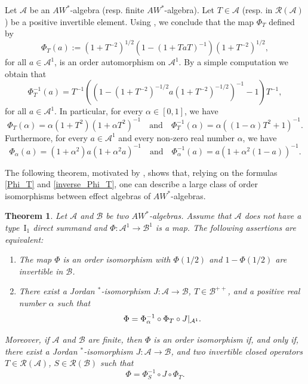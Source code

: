 \documentclass[12pt]{amsart}
\newtheorem{thm}{Theorem}[section]
\theoremstyle{definition}
\theoremstyle{remark}
\numberwithin{equation}{section}
\begin{document}
Let $\mathcal{A}$ be an $AW^*$-algebra (resp. finite  $AW^*$-algebra). Let $T\in\mathcal{A}$ (resp. in $\mathcal{R(A)}$)  be a positive invertible element. Using \cite[Lemma 8.12]{Berberian2}, we conclude that the map $\Phi_T$ defined  by	
\begin{equation}\label{Phi_T}
\Phi_T(a):=(1+T^{-2})^{1/2}\left(  1-(1+TaT)^{-1}\right) (1+T^{-2})^{1/2},	
\end{equation}
for all $a\in\mathcal{A}^1$, is an order automorphism on $\mathcal{A}^1$. By a simple computation we obtain  that 
\begin{equation}\label{inverse_Phi_T}
\Phi_T^{-1}(a)=T^{-1}\left(\left(   1-(1+T^{-2})^{-1/2}a(1+T^{-2})^{-1/2}\right)^{-1} -1\right) T^{-1},	
\end{equation}
for all $a\in\mathcal{A}^1$. In particular, for every   $\alpha\in[0,1]$, we have
\begin{equation}\label{Phi(alpha)}
\Phi_T(\alpha)=\alpha (1+T^{2})(1+\alpha T^2)^{-1} \quad \mbox{and} \quad \Phi_T^{-1}(\alpha)=\alpha \left( (1-\alpha)T^2+1\right)^{-1}. 	
\end{equation}
Furthermore, for every $a\in\mathcal{A}^1$ and every  non-zero real number $\alpha$, we have 
\begin{equation}\label{Phi_alpha}
	\Phi_\alpha(a)=(1+\alpha^{2})a(1+\alpha^2a)^{-1} \quad \mbox{and} \quad \Phi_\alpha^{-1}(a)=a \left(1+\alpha^2(1-a)\right)^{-1}.	
\end{equation}


The following theorem, motivated by \cite[Theorem 2.3]{Semrl}, shows that,  relying on the formulas \eqref{Phi_T} and \eqref {inverse_Phi_T}, one can describe a large class of order isomorphisms between effect algebras of   $AW^*$-algebras.

\begin{thm}\label{general_formula}
Let $\mathcal{A}$ and $\mathcal{B}$ be two $AW^*$-algebras. Assume that $\mathcal{A}$ does not have a type~$\mathrm{I}_1$ direct summand and  $\Phi:\mathcal{A}^1\to \mathcal{B}^1$  is a map. The following assertions are equivalent:

\begin{enumerate}
	\item  The map $\Phi$ is an order isomorphism with $\Phi(1/2)$ and $1-\Phi(1/2)$ are invertible in $\mathcal{B}$.
	\item  There exist a  Jordan $^*$-isomorphism $J:\mathcal{A}\to\mathcal{B}$,      $T\in\mathcal{B}^{++}$,  and a positive  real number  $\alpha$ such that $$\Phi=\Phi_\alpha^{-1}\circ\Phi_{T}\circ J\arrowvert_{\mathcal{A}^1}.$$
\end{enumerate} 
Moreover, if  $\mathcal{A}$ and $\mathcal{B}$ are finite, then $\Phi$ is an order isomorphism if, and only if, there exist a  Jordan $^*$-isomorphism $J:\mathcal{A}\to\mathcal{B}$, and two invertible closed operators $T\in\mathcal{R(A)}$, $S\in\mathcal{R(B)}$ such that $$\Phi=\Phi_{S}^{-1}\circ J \circ\Phi_{T}.$$
\end{thm}
\end{document}
